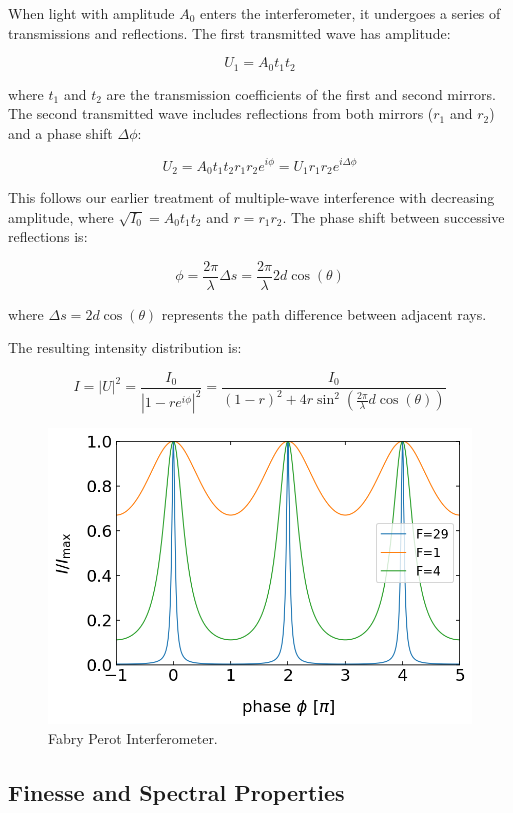 \documentclass[
  a4paper,
]{book}
\begin{document}
When light with amplitude \(A_0\) enters the interferometer, it
undergoes a series of transmissions and reflections. The first
transmitted wave has amplitude:

\[
U_1=A_0t_1 t_2
\]

where \(t_1\) and \(t_2\) are the transmission coefficients of the first
and second mirrors. The second transmitted wave includes reflections
from both mirrors (\(r_1\) and \(r_2\)) and a phase shift
\(\Delta\phi\):

\[
U_2=A_0t_1 t_2 r_1 r_2 e^{i\phi}=U_1 r_1 r_2 e^{i\Delta\phi}
\]

This follows our earlier treatment of multiple-wave interference with
decreasing amplitude, where \(\sqrt{I_0}=A_0 t_1 t_2\) and \(r=r_1r_2\).
The phase shift between successive reflections is:

\[
\phi=\frac{2\pi}{\lambda} \Delta s = \frac{2\pi}{\lambda} 2d\cos(\theta)
\]

where \(\Delta s=2d\cos(\theta)\) represents the path difference between
adjacent rays.

The resulting intensity distribution is:

\[
I=|U|^2=\frac{I_{0}}{|1-re^{i\phi}|^2}=\frac{I_0}{(1-r)^2+4r\sin^2\left (\frac{2\pi}{\lambda} d\cos(\theta)\right)}
\]

\begin{figure}[H]

{\centering \includegraphics[width=0.6\linewidth,height=\textheight,keepaspectratio]{wave-optics/img/perot.png}

}

\caption{Fabry Perot Interferometer.}

\end{figure}%

\subsection{Finesse and Spectral
Properties}\label{finesse-and-spectral-properties}
\end{document}
